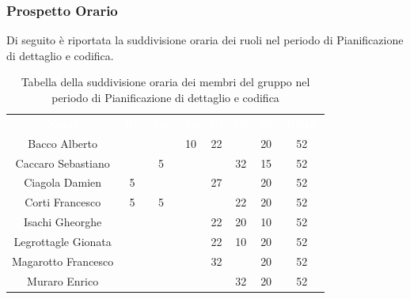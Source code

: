 \subsubsection{Prospetto Orario}
Di seguito è riportata la suddivisione oraria dei ruoli nel periodo di Pianificazione di dettaglio e codifica.




\begin{table}[H]	
	\begin{center}
	    \begin{tabular}{cccccccc}
			\rowcolor{greySWEight}
			\textcolor{white}{\textbf{Nome}} & \textcolor{white}{\textbf{Re}} & \textcolor{white}{\textbf{Am}} & \textcolor{white}{\textbf{An}} & \textcolor{white}{\textbf{Pj}} & \textcolor{white}{\textbf{Pr}} & \textcolor{white}{\textbf{Ve}} & \textcolor{white}{\textbf{Totale}}
			\\ 
			Bacco Alberto & & & 10 & 22 & & 20 & 52 \\
			Caccaro Sebastiano & & 5 & & & 32 & 15 & 52 \\
			Ciagola Damien & 5 & & & 27 & & 20 & 52 \\
			Corti Francesco & 5 & 5 & & & 22 & 20 & 52 \\
			Isachi Gheorghe & & & & 22 & 20 & 10 & 52 \\
			Legrottagle Gionata & & & & 22 & 10 & 20 & 52 \\
			Magarotto Francesco & & & & 32 & & 20 & 52 \\
			Muraro Enrico & & & & & 32 & 20 & 52 \\
			\end{tabular}
	    \caption{Tabella della suddivisione oraria dei membri del gruppo nel periodo di Pianificazione di dettaglio e codifica} \label{tab:tabellaPersonePianificazione di dettaglio e codifica} 
	\end{center}
\end{table}

